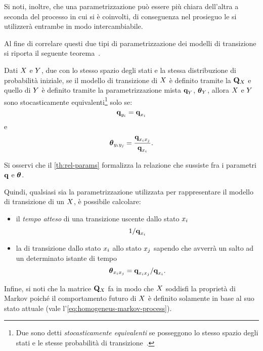 \begin{osservazione}
Si noti, inoltre, che una parametrizzazione può essere più chiara dell'altra a seconda del processo in cui si è coinvolti, di conseguenza nel prosieguo le si utilizzerà entrambe in modo intercambiabile.
\end{osservazione}
Al fine di correlare questi due tipi di parametrizzazione dei modelli di transizione si riporta il seguente teorema~\citep{Nodelman2007}.
\begin{teorema}\label{th:rel-params}
Dati $\mathnormal{X}$ e $\mathnormal{Y}$, due \mprocess{} \omog{} con lo stesso spazio degli stati e la stessa distribuzione di probabilità iniziale, se il modello di transizione di $\mathnormal{X}$ è definito tramite la \im*{} $\mathbf{Q}_{\mathnormal{X}}$ e quello di $\mathnormal{Y}$ è definito tramite la parametrizzazione mista $\boldsymbol{\textbf{\text{q}}}_{\mathnormal{Y}}$, $\boldsymbol{\textbf{\text{$\theta$}}}_{\mathnormal{Y}}$, allora $\mathnormal{X}$ e $\mathnormal{Y}$ sono stocasticamente equivalenti\footnote{Due \mprocess{} sono detti \emph{stocasticamente equivalenti} se posseggono lo stesso spazio degli stati e le stesse probabilità di transizione~\citep{Gihman1973}.} solo se:
\[
\boldsymbol{\textbf{\text{q}}}_{\mathnormal{y}_i} = \boldsymbol{\textbf{\text{q}}}_{\mathnormal{x}_i}
\]
e
\[
\boldsymbol{\textbf{\text{$\theta$}}}_{\mathnormal{y}_i\mathnormal{y}_j} = \frac{\boldsymbol{\textbf{\text{q}}}_{\mathnormal{x}_i\mathnormal{x}_j}}{\boldsymbol{\textbf{\text{q}}}_{\mathnormal{x}_i}}\text{.}
\]
\end{teorema}
\begin{osservazione}
Si osservi che il \autoref{th:rel-params} formalizza la relazione che sussiste fra i parametri $\boldsymbol{\textbf{\text{q}}}$ e $\boldsymbol{\textbf{\text{$\theta$}}}$.
\end{osservazione}
Quindi, qualsiasi sia la parametrizzazione utilizzata per rappresentare il modello di transizione di un \mprocess*{} \omog*{} $\mathnormal{X}$, è possibile calcolare:
\begin{itemize}
    \item il \emph{tempo atteso} di una transizione uscente dallo stato $\mathnormal{x}_i$ \[1/\boldsymbol{\textbf{\text{q}}}_{\mathnormal{x}_i}\]
    \item la \emph{} di transizione dallo stato $\mathnormal{x}_i$ allo stato $\mathnormal{x}_j$ sapendo che avverrà un salto ad un determinato istante di tempo \[\boldsymbol{\textbf{\text{$\theta$}}}_{\mathnormal{x}_i\mathnormal{x}_j}=\boldsymbol{\textbf{\text{q}}}_{\mathnormal{x}_i\mathnormal{x}_j}/\boldsymbol{\textbf{\text{q}}}_{\mathnormal{x}_i}\text{.}\]
\end{itemize}
Infine, si noti che la matrice $\mathbf{Q}_{\mathnormal{X}}$ fa in modo che $\mathnormal{X}$ soddisfi la proprietà di Markov poiché il comportamento futuro di $\mathnormal{X}$ è definito solamente in base al suo stato attuale (vale l'\autoref{eq:homogeneus-markov-process}).

